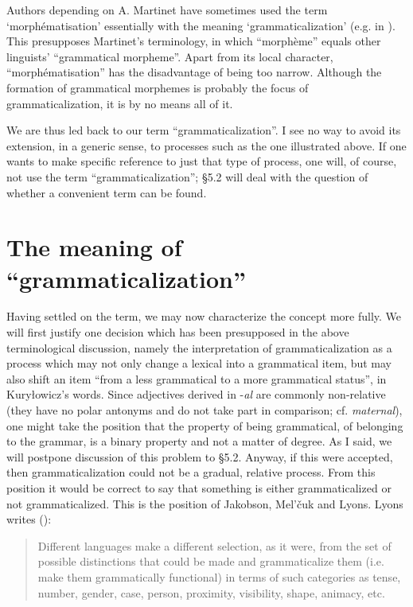 Authors depending on A. Martinet have sometimes used the term `morphématisation' essentially with the meaning `grammaticalization' (e.g. in \citealt[1064f]{Martinet1968}). This presupposes Martinet's terminology, in which ``morphème'' equals other linguists' ``grammatical morpheme''. Apart from its local character, ``morphématisation'' has the disadvantage of being too narrow. Although the formation of grammatical morphemes is probably the focus of grammaticalization, it is by no means all of it.

We are thus led back to our term ``grammaticalization''. I see no way to avoid its extension, in a generic sense, to processes such as the one illustrated above. If one wants to make specific reference to just that type of process, one will, of course, not use the term ``grammaticalization''; §5.2 will deal with the question of whether a convenient term can be found.

\section{The meaning of ``grammaticalization''} \label{sec:2.2}

Having settled on the term, we may now characterize the concept more fully. We will first justify one decision which has been presupposed in the above terminological discussion, namely the interpretation of grammaticalization as a process which may not only change a lexical into a grammatical item, but may also shift an item “from a less grammatical to a more grammatical status”, in Kuryłowicz's words. Since adjectives derived in -\textit{al} are commonly non-relative (they have no polar antonyms and do not take part in comparison; cf. \textit{maternal}), one might take the position that the property of being grammatical, of belonging to the grammar, is a binary property and not a matter of degree. As I said, we will postpone discussion of this problem to §5.2. Anyway, if this were accepted, then grammaticalization could not be a gradual, relative process. From this position it would be correct to say that something is either grammaticalized or not grammaticalized. This is the position of Jakobson, Mel'čuk and Lyons. Lyons writes (\citeyear[234]{Lyons1977}):

\begin{quote}
Different languages make a different selection, as it were, from the set of possible distinctions that could be made and grammaticalize them (i.e. make them grammatically functional) in terms of such categories as tense, number, gender, case, person, proximity, visibility, shape, animacy, etc.
\end{quote}


